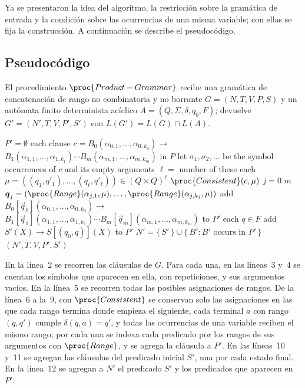 Ya se presentaron la idea del algoritmo, la restricción sobre la
gramática de entrada y la condición sobre las ocurrencias de una misma
variable; con ellas se fija la construcción. A continuación se describe
el pseudocódigo.

\subsection{Pseudocódigo}

El procedimiento $\proc{Product-Grammar}$ recibe una gramática de
concatenación de rango no combinatoria y
no borrante $G = (N, T, V, P, S)$ y un autómata finito
determinista acíclico $A = (Q, \Sigma, \delta, q_0, F)$; devuelve
$G' = (N', T, V, P', S')$ con $L(G') = L(G) \cap L(A)$.

\begin{codebox}
\li $P' = \emptyset$
\li \For each clause $c = B_0(\alpha_{0,1}, \ldots, \alpha_{0,k_0}) \to {}$
\zi \qquad $B_1(\alpha_{1,1}, \ldots, \alpha_{1,k_1}) \cdots B_m(\alpha_{m,1}, \ldots, \alpha_{m,k_m})$ in $P$
\li \Do
        let $\sigma_1, \sigma_2, \ldots$ be the symbol occurrences of $c$ and its empty arguments
\li     $\ell = $ number of these
\li     \For each $\mu = ((q_1, q'_1), \ldots, (q_\ell, q'_\ell)) \in (Q \times Q)^\ell$
\li     \Do
            \If $\proc{Consistent}(c, \mu)$
\li         \Then
                \For $j = 0$ \To $m$
\li             \Do
                    $\vec{q}_j = (\proc{Range}(\alpha_{j,1}, \mu), \ldots, \proc{Range}(\alpha_{j,k_j}, \mu))$
                \End
\li             add $B_0[\vec{q}_0](\alpha_{0,1}, \ldots, \alpha_{0,k_0}) \to {}$
\zi \qquad\qquad $B_1[\vec{q}_1](\alpha_{1,1}, \ldots, \alpha_{1,k_1}) \cdots B_m[\vec{q}_m](\alpha_{m,1}, \ldots, \alpha_{m,k_m})$ to $P'$
            \End
        \End
    \End
\li \For each $q \in F$
\li \Do
        add $S'(X) \to S[(q_0, q)](X)$ to $P'$
    \End
\li $N' = \{\, S' \,\} \cup \{\, B' : B' \text{ occurs in } P' \,\}$
\li \Return $(N', T, V, P', S')$
\end{codebox}

En la línea~2 se recorren las cláusulas de $G$. Para cada una, en las
líneas~3 y~4 se cuentan los símbolos que aparecen en ella, con
repeticiones, y sus argumentos vacíos. En la línea~5 se recorren todas
las posibles asignaciones de rangos. De la línea~6 a la~9, con $\proc{Consistent}$ se conservan
solo las asignaciones en las que cada rango termina donde empieza el
siguiente, cada terminal $a$ con rango $(q, q')$ cumple
$\delta(q, a) = q'$, y todas las ocurrencias de una variable reciben el
mismo rango; por cada una se indexa cada predicado por los rangos de sus
argumentos con $\proc{Range}$, y se agrega la cláusula a $P'$. En las líneas~10 y~11 se
agregan las cláusulas del predicado inicial $S'$, una por cada estado
final. En la línea~12 se agregan a $N'$ el
predicado $S'$ y los predicados que aparecen en $P'$.

